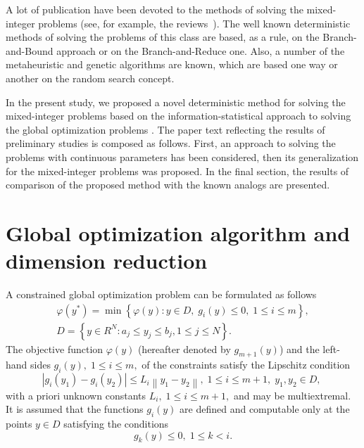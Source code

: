 \documentclass{llncs}
\begin{document}
A lot of publication have been devoted to the methods of solving the mixed-integer problems 
(see, for example, the reviews~\cite{Burer,Boukouvala}). The well known deterministic 
methods of solving the problems of this class are based, as a rule, on the Branch-and-Bound 
approach or on the Branch-and-Reduce one. Also, a number of the metaheuristic and genetic 
algorithms are known, which are based one way or another on the random search concept.

In the present study, we proposed a novel deterministic method for solving the mixed-integer 
problems based on the information-statistical approach to solving the global optimization 
problems \cite{Strongin2000,Strongin2013}. The paper text reflecting the results of preliminary 
studies is composed as follows. First, an approach to solving the problems with continuous 
parameters has been considered, then its generalization for the mixed-integer problems was 
proposed. In the final section, the results of comparison of the proposed method with the 
known analogs are presented.

\section{Global optimization algorithm and dimension reduction}

A constrained global optimization problem can be formulated as follows
\begin{gather}\label{problem}
\varphi(y^\ast)=\min{\left\{\varphi(y):y\in D, \; g_i(y)\leq 0, \; 1 \leq i \leq m\right\}},\\
D=\left\{y\in R^N: a_j\leq y_j \leq b_j, 1\leq j \leq N \right\}.\label{D}
\end{gather}
The objective function $\varphi(y)$ (hereafter denoted by $g_{m+1}(y)$) and the left-hand 
sides $g_i(y), \; 1\leq i \leq m,$ of the constraints satisfy the Lipschitz condition 
\[
\left|g_i(y_1)-g_i(y_2)\right|\leq L_i\left\|y_1-y_2\right\|, \;1\leq i\leq m+1, \; y_1,y_2 \in D,\;
\]
with a priori unknown constants $L_i, \; 1 \leq i \leq m+1,$ and may be multiextremal. It is 
assumed that the functions $g_i(y)$ are defined and computable only at the points $y \in D$ 
satisfying the conditions
\begin{equation}\label{g_k}
g_k(y) \leq 0, \; 1 \leq k < i.
\end{equation}
\end{document}
